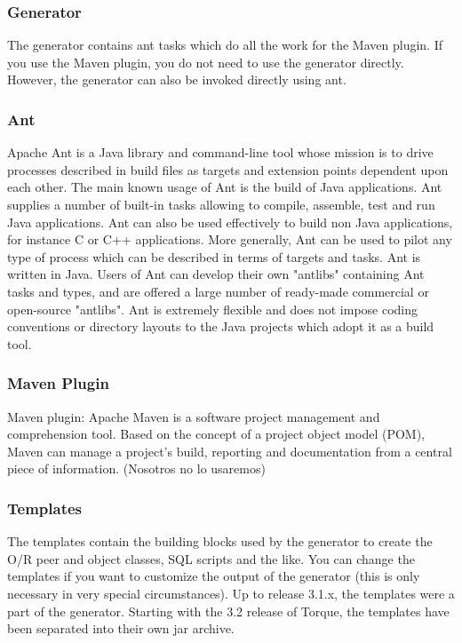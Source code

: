 \documentclass[12pt, oneside]{article}
\begin{document}
\subsubsection{Generator}
The generator contains ant tasks which do all the work for the Maven plugin. If you use the Maven plugin, you do not need to use the generator directly. However, the generator can also be invoked directly using ant.

\subsubsection{Ant}
Apache Ant is a Java library and command-line tool whose mission is to drive processes described in build files as targets and extension points dependent upon each other. The main known usage of Ant is the build of Java applications. Ant supplies a number of built-in tasks allowing to compile, assemble, test and run Java applications. Ant can also be used effectively to build non Java applications, for instance C or C++ applications. More generally, Ant can be used to pilot any type of process which can be described in terms of targets and tasks. Ant is written in Java. Users of Ant can develop their own "antlibs" containing Ant tasks and types, and are offered a large number of ready-made commercial or open-source "antlibs". Ant is extremely flexible and does not impose coding conventions or directory layouts to the Java projects which adopt it as a build tool.

\subsubsection{Maven Plugin}
Maven plugin: Apache Maven is a software project management and comprehension tool. Based on the concept of a project object model (POM), Maven can manage a project's build, reporting and documentation from a central piece of information. (Nosotros no lo usaremos)

\subsubsection{Templates}
The templates contain the building blocks used by the generator to create the O/R peer and object classes, SQL scripts and the like. You can change the templates if you want to customize the output of the generator (this is only necessary in very special circumstances). Up to release 3.1.x, the templates were a part of the generator. Starting with the 3.2 release of Torque, the templates have been separated into their own jar archive.
\end{document}
